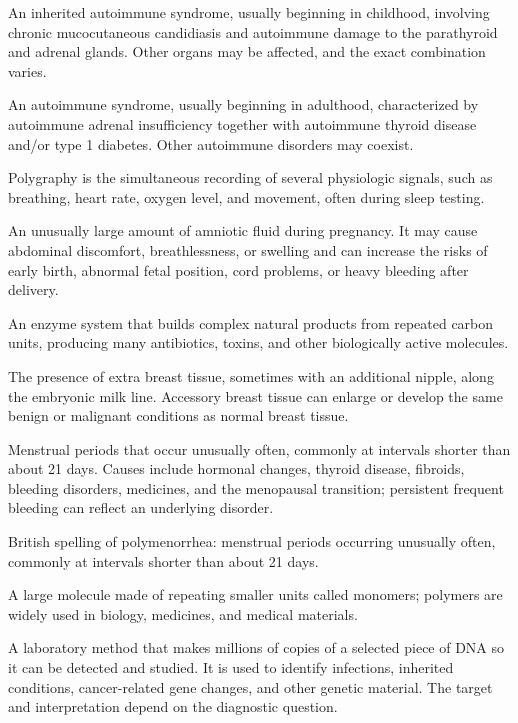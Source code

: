  An inherited autoimmune syndrome, usually beginning in childhood, involving chronic mucocutaneous candidiasis and autoimmune damage to the parathyroid and adrenal glands. Other organs may be affected, and the exact combination varies.

 An autoimmune syndrome, usually beginning in adulthood, characterized by autoimmune adrenal insufficiency together with autoimmune thyroid disease and/or type 1 diabetes. Other autoimmune disorders may coexist.

 Polygraphy is the simultaneous recording of several physiologic signals, such as breathing, heart rate, oxygen level, and movement, often during sleep testing.

 An unusually large amount of amniotic fluid during pregnancy. It may cause abdominal discomfort, breathlessness, or swelling and can increase the risks of early birth, abnormal fetal position, cord problems, or heavy bleeding after delivery.

 An enzyme system that builds complex natural products from repeated carbon units, producing many antibiotics, toxins, and other biologically active molecules.

 The presence of extra breast tissue, sometimes with an additional nipple, along the embryonic milk line. Accessory breast tissue can enlarge or develop the same benign or malignant conditions as normal breast tissue.

 Menstrual periods that occur unusually often, commonly at intervals shorter than about 21 days. Causes include hormonal changes, thyroid disease, fibroids, bleeding disorders, medicines, and the menopausal transition; persistent frequent bleeding can reflect an underlying disorder.

 British spelling of polymenorrhea: menstrual periods occurring unusually often, commonly at intervals shorter than about 21 days.

 A large molecule made of repeating smaller units called monomers; polymers are widely used in biology, medicines, and medical materials.

 A laboratory method that makes millions of copies of a selected piece of DNA so it can be detected and studied. It is used to identify infections, inherited conditions, cancer-related gene changes, and other genetic material. The target and interpretation depend on the diagnostic question.

